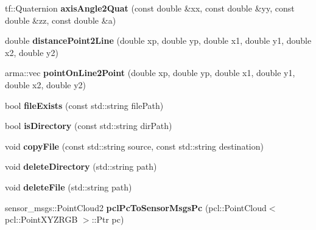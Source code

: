 \begin{DoxyCompactItemize}
\item 
tf\+::\+Quaternion {\bfseries axis\+Angle2\+Quat} (const double \&xx, const double \&yy, const double \&zz, const double \&a)\hypertarget{namespacekukadu_a380906e9d4452baf8a8ba8d6dd2495f6}{}\label{namespacekukadu_a380906e9d4452baf8a8ba8d6dd2495f6}

\item 
double {\bfseries distance\+Point2\+Line} (double xp, double yp, double x1, double y1, double x2, double y2)\hypertarget{namespacekukadu_a228221f75f3f3f319b2d957be2308935}{}\label{namespacekukadu_a228221f75f3f3f319b2d957be2308935}

\item 
arma\+::vec {\bfseries point\+On\+Line2\+Point} (double xp, double yp, double x1, double y1, double x2, double y2)\hypertarget{namespacekukadu_a67c10a1b48929f4eba41cb9d7783fa6f}{}\label{namespacekukadu_a67c10a1b48929f4eba41cb9d7783fa6f}

\item 
bool {\bfseries file\+Exists} (const std\+::string file\+Path)\hypertarget{namespacekukadu_acea96b38a689bb37e60bf5b2b1d8c647}{}\label{namespacekukadu_acea96b38a689bb37e60bf5b2b1d8c647}

\item 
bool {\bfseries is\+Directory} (const std\+::string dir\+Path)\hypertarget{namespacekukadu_a38a6347a1a0d304a8d45a9d4889b53c1}{}\label{namespacekukadu_a38a6347a1a0d304a8d45a9d4889b53c1}

\item 
void {\bfseries copy\+File} (const std\+::string source, const std\+::string destination)\hypertarget{namespacekukadu_a6a9de076b50575d26267cb848d76bc63}{}\label{namespacekukadu_a6a9de076b50575d26267cb848d76bc63}

\item 
void {\bfseries delete\+Directory} (std\+::string path)\hypertarget{namespacekukadu_abfc9dfeb9dd1af314816fbaca89bc25d}{}\label{namespacekukadu_abfc9dfeb9dd1af314816fbaca89bc25d}

\item 
void {\bfseries delete\+File} (std\+::string path)\hypertarget{namespacekukadu_a13aab802ace83e2d78679d3a2a94fbff}{}\label{namespacekukadu_a13aab802ace83e2d78679d3a2a94fbff}

\item 
sensor\+\_\+msgs\+::\+Point\+Cloud2 {\bfseries pcl\+Pc\+To\+Sensor\+Msgs\+Pc} (pcl\+::\+Point\+Cloud$<$ pcl\+::\+Point\+X\+Y\+Z\+R\+GB $>$\+::Ptr pc)\hypertarget{namespacekukadu_a4edf8b17d7b2f11d08a1076bec270959}{}\label{namespacekukadu_a4edf8b17d7b2f11d08a1076bec270959}


\end{DoxyCompactItemize}
